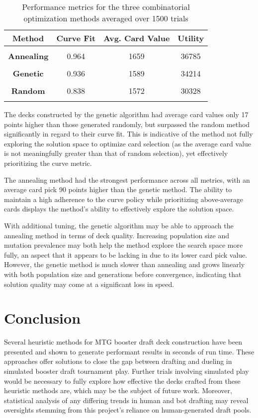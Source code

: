 \documentclass[letterpaper]{article} %
\begin{document}
\begin{table}
\begin{center}
\begin{tabular}{c c c c}
\hline
\textbf{Method}&Curve Fit&Avg. Card Value&Utility \\\hline\\
\textbf{Annealing} & 0.964 & 1659 & 36785 \\\\
\textbf{Genetic} & 0.936 & 1589 & 34214 \\\\
\textbf{Random} & 0.838 & 1572 & 30328  \\\\
\hline
\end{tabular}
\end{center}
\caption{Performance metrics for the three combinatorial optimization methods averaged over 1500 trials}
\end{table}

The decks constructed by the genetic algorithm had average card values only 17 points higher than those generated randomly, but surpassed the random method significantly in regard to their curve fit. This is indicative of the method not fully exploring the solution space to optimize card selection (as the average card value is not meaningfully greater than that of random selection), yet effectively prioritizing the curve metric.

The annealing method had the strongest performance across all metrics, with an average card pick 90 points higher than the genetic method. The ability to maintain a high adherence to the curve policy while prioritizing above-average cards displays the method's ability to effectively explore the solution space.

With additional tuning, the genetic algorithm may be able to approach the annealing method in terms of deck quality. Increasing population size and mutation prevalence may both help the method explore the search space more fully, an aspect that it appears to be lacking in due to its lower card pick value. However, the genetic method is much slower than annealing and grows linearly with both population size and generations before convergence, indicating that solution quality may come at a significant loss in speed.

\section{Conclusion}

Several heuristic methods for MTG booster draft deck construction have been presented and shown to generate performant results in seconds of run time. These approaches offer solutions to close the gap between drafting and dueling in simulated booster draft tournament play. Further trials involving simulated play would be necessary to fully explore how effective the decks crafted from these heuristic methods are, which may be the subject of future work. Moreover, statistical analysis of any differing trends in human and bot drafting may reveal oversights stemming from this project's reliance on human-generated draft pools.


\end{document}
